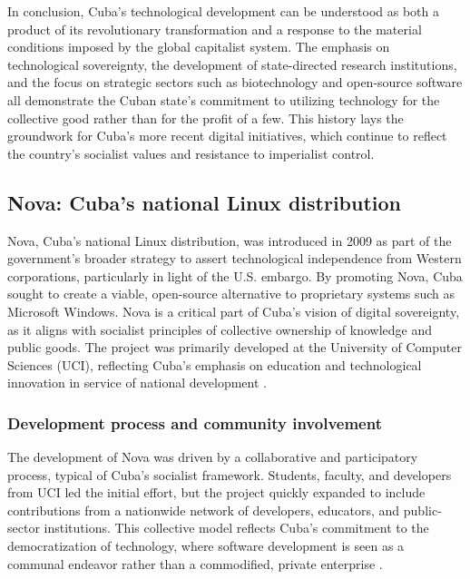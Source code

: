 \begin{refsection}
In conclusion, Cuba’s technological development can be understood as both a product of its revolutionary transformation and a response to the material conditions imposed by the global capitalist system. The emphasis on technological sovereignty, the development of state-directed research institutions, and the focus on strategic sectors such as biotechnology and open-source software all demonstrate the Cuban state's commitment to utilizing technology for the collective good rather than for the profit of a few. This history lays the groundwork for Cuba’s more recent digital initiatives, which continue to reflect the country’s socialist values and resistance to imperialist control.

\subsection{Nova: Cuba's national Linux distribution}

Nova, Cuba's national Linux distribution, was introduced in 2009 as part of the government's broader strategy to assert technological independence from Western corporations, particularly in light of the U.S. embargo. By promoting Nova, Cuba sought to create a viable, open-source alternative to proprietary systems such as Microsoft Windows. Nova is a critical part of Cuba’s vision of digital sovereignty, as it aligns with socialist principles of collective ownership of knowledge and public goods. The project was primarily developed at the University of Computer Sciences (UCI), reflecting Cuba's emphasis on education and technological innovation in service of national development \cite[pp.~45-67]{feinberg}.

\subsubsection{Development process and community involvement}

The development of Nova was driven by a collaborative and participatory process, typical of Cuba’s socialist framework. Students, faculty, and developers from UCI led the initial effort, but the project quickly expanded to include contributions from a nationwide network of developers, educators, and public-sector institutions. This collective model reflects Cuba’s commitment to the democratization of technology, where software development is seen as a communal endeavor rather than a commodified, private enterprise \cite[pp.~90-112]{kapcia}.


\end{refsection}
